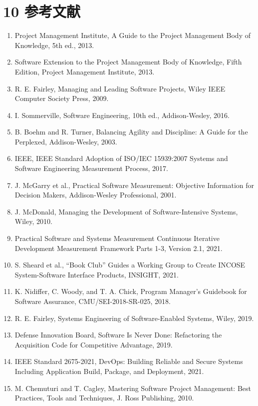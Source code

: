 \documentclass[a4paper,11pt]{ltjsarticle}
\begin{document}
\section{10 参考文献}
\begin{enumerate}[leftmargin=2em]
  \item Project Management Institute, A Guide to the Project Management Body of Knowledge, 5th ed., 2013.
  \item Software Extension to the Project Management Body of Knowledge, Fifth Edition, Project Management Institute, 2013.
  \item R. E. Fairley, Managing and Leading Software Projects, Wiley IEEE Computer Society Press, 2009.
  \item I. Sommerville, Software Engineering, 10th ed., Addison-Wesley, 2016.
  \item B. Boehm and R. Turner, Balancing Agility and Discipline: A Guide for the Perplexed, Addison-Wesley, 2003.
  \item IEEE, IEEE Standard Adoption of ISO/IEC 15939:2007 Systems and Software Engineering Measurement Process, 2017.
  \item J. McGarry et al., Practical Software Measurement: Objective Information for Decision Makers, Addison-Wesley Professional, 2001.
  \item J. McDonald, Managing the Development of Software-Intensive Systems, Wiley, 2010.
  \item Practical Software and Systems Measurement Continuous Iterative Development Measurement Framework Parts 1-3, Version 2.1, 2021.
  \item S. Sheard et al., “Book Club” Guides a Working Group to Create INCOSE System-Software Interface Products, INSIGHT, 2021.
  \item K. Nidiffer, C. Woody, and T. A. Chick, Program Manager’s Guidebook for Software Assurance, CMU/SEI-2018-SR-025, 2018.
  \item R. E. Fairley, Systems Engineering of Software-Enabled Systems, Wiley, 2019.
  \item Defense Innovation Board, Software Is Never Done: Refactoring the Acquisition Code for Competitive Advantage, 2019.
  \item IEEE Standard 2675-2021, DevOps: Building Reliable and Secure Systems Including Application Build, Package, and Deployment, 2021.
  \item M. Chemuturi and T. Cagley, Mastering Software Project Management: Best Practices, Tools and Techniques, J. Ross Publishing, 2010.
\end{enumerate}
\end{document}
